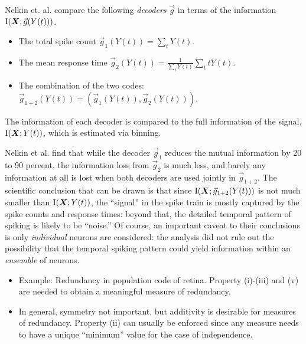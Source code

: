 Nelkin et. al. compare the following \emph{decoders} $\vec{g}$ in terms
of the information $\text{I}(\boldsymbol{X}; \vec{g}(Y(t)))$.
\begin{itemize}
\item The total spike count $\vec{g}_1(Y(t)) = \sum_t Y(t)$.
\item The mean response time $\vec{g}_2(Y(t)) = \frac{1}{\sum_t Y(t)} \sum_t t Y(t)$.
\item The combination of the two codes: $\vec{g}_{1+2}(Y(t)) = (\vec{g}_1(Y(t)), \vec{g}_2(Y(t)))$.
\end{itemize}
The information of each decoder is compared to the full information of
the signal, $\text{I}(\boldsymbol{X}; Y(t))$, which is estimated via binning.

Nelkin et al. find that while the decoder $\vec{g}_1$ reduces the
mutual information by 20 to 90 percent, the information loss from
$\vec{g}_2$ is much less, and barely any information at all is lost
when both decoders are used jointly in $\vec{g}_{1+2}$.  The
scientific conclusion that can be drawn is that since
$\text{I}(\boldsymbol{X}; \vec{g}_{1+2}(Y(t)))$ is not much smaller than
$\text{I}(\boldsymbol{X}; Y(t))$, the ``signal'' in the spike train is mostly
captured by the spike counts and response times: beyond that, the
detailed temporal pattern of spiking is likely to be ``noise.''  Of
course, an important caveat to their conclusions is
only \emph{individual} neurons are considered: the analysis did not
rule out the possibility that the temporal spiking pattern could yield
information within an \emph{ensemble} of neurons.


\begin{itemize}
\item Example: Redundancy in population code of retina.  
Property (i)-(iii) and (v) are needed to obtain a meaningful measure
of redundancy.
\item In general, symmetry not important, but additivity is desirable 
for measures of redundancy.  Property (ii) can usually be enforced
since any measure needs to have a unique ``minimum'' value for the
case of independence.
\end{itemize}





